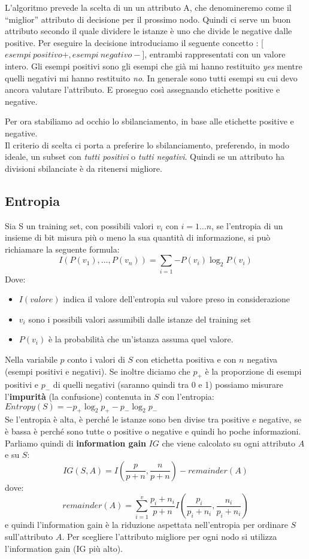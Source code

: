 L'algoritmo prevede la scelta di un un attributo A, che denomineremo come il ``miglior'' attributo di decisione per il prossimo nodo. Quindi ci serve un buon attributo secondo il quale dividere le istanze è uno che divide le negative dalle positive.
Per eseguire la decisione introduciamo il seguente concetto : [$esempi \ positivo+, esempi \ negativo-$], entrambi rappresentati con un valore intero. Gli esempi positivi sono gli esempi che già mi hanno restituito \textit{yes} mentre quelli negativi mi hanno restituito \textit{no}. In generale sono tutti esempi su cui devo ancora valutare l'attributo. E proseguo così assegnando etichette positive e negative.
\newline

Per ora stabiliamo ad occhio lo sbilanciamento, in base alle etichette positive e negative.\\ Il criterio di scelta ci porta a preferire lo sbilanciamento, preferendo, in modo ideale, un subset con \textit{tutti positivi} o \textit{tutti negativi}. Quindi se un attributo ha divisioni sbilanciate è da ritenersi migliore.

\subsection{Entropia}
Sia S un training set, con possibili valori $v_i$ con $i = 1 \dots n$, se l’entropia di un insieme di bit misura più o meno la sua quantità di informazione, si può richiamare la seguente formula: $$I(P(v_1),\dots,P(v_n))=\displaystyle \sum_{i=1}{-P(v_i)\log_2P(v_i)}$$
Dove:
\begin{itemize}
    \item $I(valore)$ indica il valore dell'entropia sul valore preso in considerazione
    \item $v_i$  sono i possibili valori assumibili dalle istanze del training set
    \item $P(v_i)$ è la probabilità che un’istanza assuma quel valore.
\end{itemize}

Nella variabile $p$ conto i valori di $S$ con etichetta positiva e con $n$ negativa (esempi positivi e negativi). Se inoltre diciamo che $p_+$ è la proporzione di esempi positivi e $p_-$ di quelli negativi (saranno quindi tra 0 e 1) possiamo misurare l'\textbf{impurità} (la confusione) contenuta in $S$ con l'entropia: $Entropy(S)=-p_+\log_2 p_+-p_-\log_2 p_-$
\\
Se l’entropia è alta, è perché le istanze sono ben divise tra positive e negative, se è bassa è perché sono tutte o positive o negative e quindi ho poche informazioni.
Parliamo quindi di \textbf{information gain} $IG$ che viene calcolato su ogni attributo $A$ e su $S$: \[IG(S,A)=I\left(\frac{p}{p+n},\frac{n}{p+n}\right)-remainder(A)\] dove: 
\[remainder(A)=\sum_{i=1}^v \frac{p_i+n_i}{p+n}I\left(\frac{p_i}{p_i+n_i},\frac{n_i}{p_i+n_i}\right)\] 
e quindi l'information gain è la riduzione aspettata nell'entropia per ordinare $S$ sull'attributo $A$. Per scegliere l’attributo migliore per ogni nodo si utilizza l’information gain (IG più alto).


